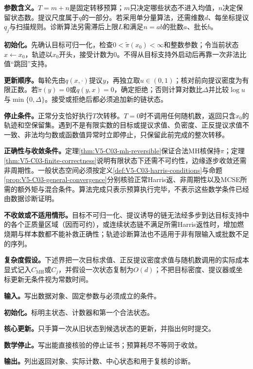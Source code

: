 \label{struct:V5-C03-CH21}
\textbf{参数含义。}$T=m+n$是固定转移预算；$m$只决定哪些状态不进入均值，$n$决定保留状态数。提议尺度属于$q$的一部分。若采用单分量算法，还需维数$d$、每坐标提议$q_j$与扫描规则。诊断算法另需滞后上限$L$和满足$n=ab$的批数$a$、批长$b$。

\label{struct:V5-C03-CH22}
\textbf{初始化。}先确认目标可归一化，检查$0<\widetilde\pi(x_0)<\infty$和整数参数；令当前状态$x\leftarrow x_0$，轨迹以$x_0$开头，接受计数为$0$。不得从目标支持外启动后再靠一次非法比值“跳回”支持。

\label{struct:V5-C03-CH23}
\textbf{更新顺序。}每轮先由$q(x,\cdot)$提议$y$，再独立取$u\in(0,1)$；核对前向提议密度为有限正数。若$\widetilde\pi(y)=0$或$q(y,x)=0$，确定拒绝；否则计算对数比$\Delta$并比较$\log u$与$\min\{0,\Delta\}$。接受或拒绝后都必须追加新的链状态。

\label{struct:V5-C03-CH24}
\textbf{停止条件。}正常分支恰好执行$T$次转移。$T=0$时不调用任何随机数，返回只含$x_0$的轨迹和空保留集。遇到不是有限实数的目标或提议求值、负密度、正反提议求值不一致、非法均匀数或函数值异常时立即停止，只保留此前完成的整次转移。

\label{struct:V5-C03-CH25}
\textbf{正确性与收敛条件。}定理\ref{thm:V5-C03-mh-reversible}保证合法MH核保持$\pi$；定理\ref{thm:V5-C03-finite-correctness}说明有限状态下还需不可约性，边缘逐步收敛还需非周期性。一般状态空间必须按定义\ref{def:V5-C03-harris-conditions}与命题\ref{prop:V5-C03-general-convergence}分别核验正常Harris返、非周期性以及MCSE所需的额外矩与混合条件。算法完成只表示预算执行完毕，不表示这些数学条件已经由数据诊断证明。

\textbf{不收敛或不适用情形。}目标不可归一化、提议诱导的链无法经多步到达目标支持中的各个正质量区域（因而可约），或连续状态链不满足所需Harris返性时，增加燃烧期与样本数都不能补救正确性；轨迹诊断算法也不适用于非有限输入或批数不足的序列。

\textbf{复杂度假设。}下述界把一次目标求值、正反提议密度求值与随机数调用的实际成本显式记入$C_{\mathrm{MH}}$或$C_j$，并假设一次状态复制为$O(d)$；不把目标密度、提议器或坐标更新无条件视为常数时间。

\begingroup
{}

\begin{keypointbox}[title={带零流分支和完整状态轨迹的一般MH：五步阅读}]
\textbf{输入。}写出数据对象、固定参数与必须成立的条件。\par
\textbf{初始化。}标明主状态、计数器和第一个合法状态。\par
\textbf{核心更新。}只手算一次从旧状态到候选状态的更新，并指出何时提交。\par
\textbf{数学停止。}写出能直接核验的停止证书；预算耗尽不等同于收敛。\par
\textbf{输出。}列出返回对象、实际计数、中心状态和用于复核的诊断。
\end{keypointbox}

